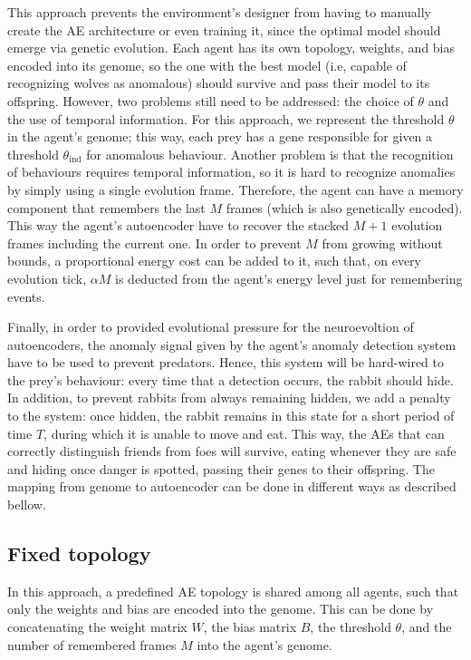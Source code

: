 \documentclass[letterpaper]{article}
\numberwithin{equation}{section}
\numberwithin{theorem}{section}
\numberwithin{lemma}{section}
\numberwithin{df}{section}
\begin{document}
This approach prevents the environment's designer from having to manually create the AE architecture or even training it, since the optimal model should emerge via genetic evolution. Each agent has its own topology, weights, and bias encoded into its genome, so the one with the best model (i.e, capable of recognizing wolves as anomalous) should survive and pass their model to its offspring. However, two problems still need to be addressed: the choice of $\theta$ and the use of temporal information. For this approach, we represent the threshold $\theta$ in the agent's genome; this way, each prey has a gene responsible for given a threshold $\theta_\text{ind}$ for anomalous behaviour. Another problem is that the recognition of behaviours requires temporal information, so it is hard to recognize anomalies by simply using a single evolution frame. Therefore, the agent can have a memory component that remembers the last $M$ frames (which is also genetically encoded). This way the agent's autoencoder have to recover the stacked $M+1$ evolution frames including the current one. In order to prevent $M$ from growing without bounds, a proportional energy cost can be added to it, such that, on every evolution tick, $\alpha M$ is deducted from the agent's energy level just for remembering events.

Finally, in order to provided evolutional pressure for the neuroevoltion of autoencoders, the anomaly signal given by the agent's anomaly detection system have to be used to prevent predators. Hence, this system will be hard-wired to the prey's behaviour: every time that a detection occurs, the rabbit should hide. In addition, to prevent rabbits from always remaining hidden, we add a penalty to the system: once hidden, the rabbit remains in this state for a short period of time $T$, during which it is unable to move and eat. This way, the AEs that can correctly distinguish friends from foes will survive, eating whenever they are safe and hiding once danger is spotted, passing their genes to their offspring. The mapping from genome to autoencoder can be done in different ways as described bellow.

\subsection{Fixed topology}

In this approach, a predefined AE topology is shared among all agents, such that only the weights and bias are encoded into the genome. This can be done by concatenating the weight matrix $W$, the bias matrix $B$, the threshold $\theta$, and the number of remembered frames $M$ into the agent's genome.
\end{document}
